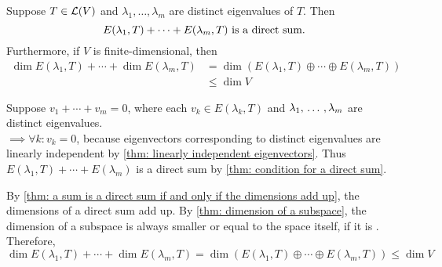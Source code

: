 \setcounter{thm}{53}
\begin{thm} 
  \label{thm: sum of eigenspaces is a direct sum}
  Suppose $T\in \mathcal{L} (V)$ and $\lambda_1, \dots, \lambda_m$ are distinct eigenvalues of $T$. Then
  \begin{equation}
    E(\lambda_1, T) + \cdots + E(\lambda_m, T) $ is a direct sum.$
  \end{equation}
  Furthermore, if $V$ is finite-dimensional, then
  \begin{equation}
    \begin{aligned}
      \dim E(\lambda_1, T) + \cdots + \dim E(\lambda_m, T)
      & = \dim \left( E(\lambda_1, T)  \oplus \cdots \oplus E(\lambda_m, T) \right) \\
      & \leq \dim V
    \end{aligned}
  \end{equation}
\end{thm}
\begin{prf}
  Suppose $v_1 + \cdots + v_m = 0$, where each $v_k \in E(\lambda_k, T)$ and $\lambda_1, {\, \ldots \,\,}, \lambda_m$ are distinct eigenvalues. \\
  $\implies \forall k: v_k = 0$, because eigenvectors corresponding to distinct eigenvalues are linearly independent by \ref{thm: linearly independent eigenvectors}. Thus $E(\lambda_1, T) + \cdots + E(\lambda_m)$ is a direct sum by \ref{thm: condition for a direct sum}.

  By \ref{thm: a sum is a direct sum if and only if the dimensions add up}, the dimensions of a direct sum add up. By \ref{thm: dimension of a subspace}, the dimension of a subspace is always smaller or equal to the space itself, if it is \fd. Therefore,
  \begin{equation}
      \dim E(\lambda_1, T) + \cdots + \dim E(\lambda_m, T)
    = \dim \left( E(\lambda_1, T)  \oplus \cdots \oplus E(\lambda_m, T) \right) \leq \dim V
  \end{equation}
  \vspace{-1em}
\end{prf}


